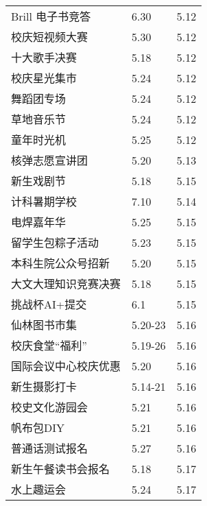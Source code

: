 \documentclass[letterpaper, 12pt]{article}
\begin{document}
\begin{multicols}{2}
{\begin{longtable}{|>{\centering\arraybackslash}m{}|m{}|m{}|}
    Brill 电子书竞答 & 6.30 & 5.12\\
    校庆短视频大赛 & 5.30 & 5.12\\
    十大歌手决赛 & 5.18 & 5.12\\
    校庆星光集市 & 5.24 & 5.12\\
    舞蹈团专场 & 5.24 & 5.12\\
    草地音乐节 & 5.24 & 5.12\\
    童年时光机 & 5.25 & 5.12\\
    核弹志愿宣讲团 & 5.20 & 5.13\\
    新生戏剧节 & 5.18 & 5.15\\
    计科暑期学校 & 7.10 & 5.14\\
    电焊嘉年华 & 5.25 & 5.15\\
    留学生包粽子活动 & 5.23 & 5.15\\
    本科生院公众号招新 & 5.20 & 5.15\\
    大文大理知识竞赛决赛 & 5.18 & 5.15\\
    挑战杯AI+提交 & 6.1 & 5.15\\
    仙林图书市集 & 5.20-23 & 5.16\\
    校庆食堂“福利” & 5.19-26 & 5.16\\
    国际会议中心校庆优惠 & 5.20 & 5.16\\
    新生摄影打卡 & 5.14-21 & 5.16\\
    校史文化游园会 & 5.21 & 5.16\\
    帆布包DIY & 5.21 & 5.16\\
    普通话测试报名 & 5.27 & 5.16\\
    新生午餐读书会报名 & 5.18 & 5.17\\
    水上趣运会 & 5.24 & 5.17\\
    \hline
\end{longtable}
\unskip
\unpenalty
\unpenalty}\unvbox\colbbox
\end{multicols}
\end{document}
